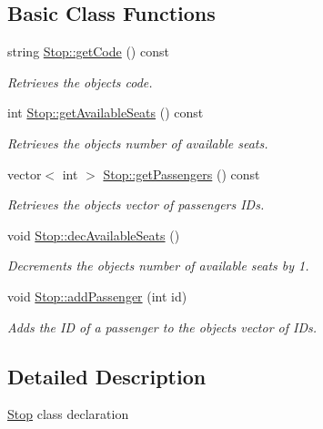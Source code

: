 \subsection*{Basic Class Functions}
\begin{DoxyCompactItemize}
\item 
string \hyperlink{group___stop_ga4c0a7bb72ca7a054a394d13fc8cd9bde}{Stop\+::get\+Code} () const
\begin{DoxyCompactList}\small\item\em Retrieves the object\textquotesingle{}s code. \end{DoxyCompactList}\item 
int \hyperlink{group___stop_ga41d42147d1210ce72f15e31a8414e0ad}{Stop\+::get\+Available\+Seats} () const
\begin{DoxyCompactList}\small\item\em Retrieves the object\textquotesingle{}s number of available seats. \end{DoxyCompactList}\item 
vector$<$ int $>$ \hyperlink{group___stop_gabd197ec53b1215bed050d879d463e987}{Stop\+::get\+Passengers} () const
\begin{DoxyCompactList}\small\item\em Retrieves the object\textquotesingle{}s vector of passengers I\+Ds. \end{DoxyCompactList}\item 
\mbox{\label{group___stop_ga491669933a1b091fa543591e9fd992aa}} 
void \hyperlink{group___stop_ga491669933a1b091fa543591e9fd992aa}{Stop\+::dec\+Available\+Seats} ()
\begin{DoxyCompactList}\small\item\em Decrements the object\textquotesingle{}s number of available seats by 1. \end{DoxyCompactList}\item 
void \hyperlink{group___stop_gac636e3c0c1e2794575bd3db14b5ee363}{Stop\+::add\+Passenger} (int id)
\begin{DoxyCompactList}\small\item\em Adds the ID of a passenger to the object\textquotesingle{}s vector of I\+Ds. \end{DoxyCompactList}\end{DoxyCompactItemize}


\subsection{Detailed Description}
\hyperlink{class_stop}{Stop} class declaration 

